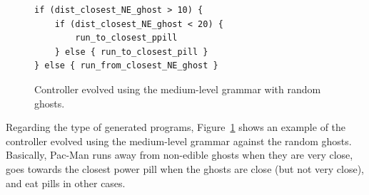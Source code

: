\documentclass{llncs}
\newcommand{\paco}{Pac-Man }
\begin{document}
\begin{figure}[tb]
	\centering
\begin{lstlisting}[frame=single, breaklines=false, basicstyle=\fontsize{10}{11}\ttfamily]
if (dist_closest_NE_ghost > 10) {
    if (dist_closest_NE_ghost < 20) { 
    	run_to_closest_ppill 
    } else { run_to_closest_pill }
} else { run_from_closest_NE_ghost }
\end{lstlisting} %
	\caption{Controller evolved using the medium-level grammar with random ghosts.}
	\label{fig:program}
\end{figure}

Regarding the type of generated programs, Figure~\ref{fig:program} shows an example of the controller evolved using the medium-level grammar against the random ghosts. Basically, \paco runs away from non-edible ghosts when they are very close, goes towards the closest power pill when the ghosts are close (but not very close), and eat pills in other cases.

%
\end{document}
